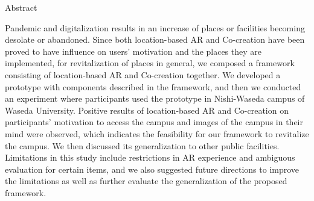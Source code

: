 \documentclass[a4paper, 12pt, oneside]{book}
\begin{document}
\pagebreak
\hspace{0pt}
\vfill %
    \begin{center}
    Abstract
    \end{center}
Pandemic and digitalization results in an increase of places or facilities becoming desolate or abandoned.
Since both location-based AR and Co-creation have been proved to have influence on users' motivation and the places they are implemented,
for revitalization of places in general, we composed a framework consisting of location-based AR and Co-creation together.
We developed a prototype with components described in the framework, and then we conducted an experiment where participants used the prototype in Nishi-Waseda campus of Waseda University.
Positive results of location-based AR and Co-creation on participants' motivation to access the campus and images of the campus in their mind were observed,
which indicates the feasibility for our framework to revitalize the campus. We then discussed its generalization to other public facilities.
Limitations in this study include restrictions in AR experience and ambiguous evaluation for certain items, and we also suggested future directions to improve the limitations as well as further evaluate the generalization of the proposed framework.
\vfill
\pagebreak




\tableofcontents
\listoffigures 
\listoftables

\clearpage
% 








\printbibliography

\appendix

\end{document}

